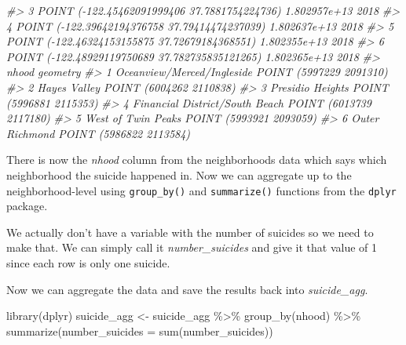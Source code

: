 \documentclass[
]{krantz}
\makeatletter
\newenvironment{Shaded}{\begin{snugshade}}{\end{snugshade}}
\newcommand{\AttributeTok}[1]{\textcolor[rgb]{0.61,0.61,0.61}{#1}}
\newcommand{\CommentTok}[1]{\textcolor[rgb]{0.37,0.37,0.37}{\textit{#1}}}
\newcommand{\DecValTok}[1]{\textcolor[rgb]{0.06,0.06,0.06}{#1}}
\newcommand{\FunctionTok}[1]{\textcolor[rgb]{0,0,0}{#1}}
\newcommand{\NormalTok}[1]{#1}
\newcommand{\OtherTok}[1]{\textcolor[rgb]{0.37,0.37,0.37}{#1}}
\newcommand{\SpecialCharTok}[1]{\textcolor[rgb]{0,0,0}{#1}}
\newenvironment{kframe}{%
\medskip{}
\setlength{\fboxsep}{.8em}
 \def\at@end@of@kframe{}%
 \ifinner\ifhmode%
  \def\at@end@of@kframe{\end{minipage}}%
  \begin{minipage}{\columnwidth}%
 \fi\fi%
 \def\FrameCommand##1{\hskip\@totalleftmargin \hskip-\fboxsep
 \colorbox{shadecolor}{##1}\hskip-\fboxsep
     \hskip-\linewidth \hskip-\@totalleftmargin \hskip\columnwidth}%
 \MakeFramed {\advance\hsize-\width
   \@totalleftmargin\z@ \linewidth\hsize
   \@setminipage}}%
 {\par\unskip\endMakeFramed%
 \at@end@of@kframe}
\renewenvironment{Shaded}{\begin{kframe}}{\end{kframe}}
\makeatother
\begin{document}
\begin{Shaded}
\begin{Highlighting}[]
\CommentTok{\#\textgreater{} 3   POINT ({-}122.45462091999406 37.7881754224736) 1.802957e+13 2018}
\CommentTok{\#\textgreater{} 4  POINT ({-}122.39642194376758 37.79414474237039) 1.802637e+13 2018}
\CommentTok{\#\textgreater{} 5  POINT ({-}122.46324153155875 37.72679184368551) 1.802355e+13 2018}
\CommentTok{\#\textgreater{} 6 POINT ({-}122.48929119750689 37.782735835121265) 1.802365e+13 2018}
\CommentTok{\#\textgreater{}                            nhood                geometry}
\CommentTok{\#\textgreater{} 1     Oceanview/Merced/Ingleside POINT (5997229 2091310)}
\CommentTok{\#\textgreater{} 2                   Hayes Valley POINT (6004262 2110838)}
\CommentTok{\#\textgreater{} 3               Presidio Heights POINT (5996881 2115353)}
\CommentTok{\#\textgreater{} 4 Financial District/South Beach POINT (6013739 2117180)}
\CommentTok{\#\textgreater{} 5             West of Twin Peaks POINT (5993921 2093059)}
\CommentTok{\#\textgreater{} 6                 Outer Richmond POINT (5986822 2113584)}
\end{Highlighting}
\end{Shaded}

There is now the \emph{nhood} column from the neighborhoods data which says which neighborhood the suicide happened in. Now we can aggregate up to the neighborhood-level using \texttt{group\_by()} and \texttt{summarize()} functions from the \texttt{dplyr} package.

We actually don't have a variable with the number of suicides so we need to make that. We can simply call it \emph{number\_suicides} and give it that value of 1 since each row is only one suicide.

\begin{Shaded}
\end{Shaded}

Now we can aggregate the data and save the results back into \emph{suicide\_agg}.

\begin{Shaded}
\begin{Highlighting}[]
\FunctionTok{library}\NormalTok{(dplyr)}
\NormalTok{suicide\_agg }\OtherTok{\textless{}{-}}\NormalTok{ suicide\_agg }\SpecialCharTok{\%\textgreater{}\%} 
  \FunctionTok{group\_by}\NormalTok{(nhood) }\SpecialCharTok{\%\textgreater{}\%} 
  \FunctionTok{summarize}\NormalTok{(}\AttributeTok{number\_suicides =} \FunctionTok{sum}\NormalTok{(number\_suicides))}
\end{Highlighting}
\end{Shaded}
\end{document}
